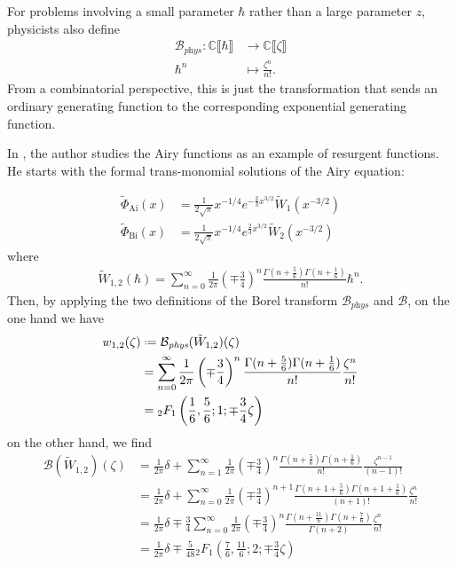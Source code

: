 \documentclass{article}
\newcommand{\maps}{\colon}
\newcommand{\C}{\mathbb{C}}
\newcommand*{\defeq}{\mathrel{\vcenter{\baselineskip0.5ex \lineskiplimit0pt
                     \hbox{\scriptsize.}\hbox{\scriptsize.}}}%
                     =}
\newcommand{\borel}{\mathcal{B}}
\theoremstyle{definition}
\theoremstyle{plain}
\begin{document}
For problems involving a small parameter $\hbar$ rather than a large parameter $z$, physicists also define
\begin{align*}
\borel_{\textit{phys}} \maps \C \llbracket \hbar \rrbracket & \to \C \llbracket \zeta \rrbracket \\
\hbar^n & \mapsto \frac{\zeta^n}{n!}.
\end{align*}
From a combinatorial perspective, this is just the transformation that sends an ordinary generating function to the corresponding exponential generating function.

In \cite{lectures-Marino}, the author studies the Airy functions as an example of resurgent functions. He starts with the formal trans-monomial solutions of the Airy equation:

\begin{align*}
\tilde{\Phi}_{\mathrm{Ai}}(x)&=\frac{1}{2\sqrt{\pi}}x^{-1/4}e^{-\tfrac{2}{3}x^{3/2}}\tilde{W}_1(x^{-3/2})\\
\tilde{\Phi}_{\mathrm{Bi}}(x)&=\frac{1}{2\sqrt{\pi}}x^{-1/4}e^{\tfrac{2}{3}x^{3/2}}\tilde{W}_2(x^{-3/2})
\end{align*}  
where 
\begin{align*}
\tilde{W}_{1,2}(\hbar)=\sum_{n=0}^{\infty}\frac{1}{2\pi}\left(\mp\frac{3}{4}\right)^{n}\frac{\Gamma(n+\frac{5}{6})\Gamma(n+\frac{1}{6})}{n!}\hbar^n.
\end{align*}
Then, by applying the two definitions of the Borel transform $\borel_{\textit{phys}}$ and $\borel$, on the one hand we have  
\begin{align*}
w_{1,2}(\zeta)&\defeq\borel_{\textit{phys}}(\tilde{W}_{1,2})(\zeta)\\
&=\sum_{n=0}^{\infty}\frac{1}{2\pi}\left(\mp\frac{3}{4}\right)^{n}\frac{\Gamma(n+\frac{5}{6})\Gamma(n+\frac{1}{6})}{n!}\frac{\zeta^n}{n!}\\
&={}_2F_1\left(\frac{1}{6},\frac{5}{6};1;\mp\frac{3}{4}\zeta\right) 
\end{align*}
on the other hand, we find
\begin{align*}
\borel(\tilde{W}_{1,2})(\zeta)&=\frac{1}{2\pi}\delta+\sum_{n=1}^{\infty} \frac{1}{2\pi}\left(\mp\frac{3}{4}\right)^{n}\frac{\Gamma(n+\frac{5}{6})\Gamma(n+\frac{1}{6})}{n!}\frac{\zeta^{n-1}}{(n-1)!}\\
&=\frac{1}{2\pi}\delta+\sum_{n=0}^{\infty} \frac{1}{2\pi}\left(\mp\frac{3}{4}\right)^{n+1}\frac{\Gamma(n+1+\frac{5}{6})\Gamma(n+1+\frac{1}{6})}{(n+1)!}\frac{\zeta^{n}}{n!}\\
&=\frac{1}{2\pi}\delta\mp\frac{3}{4}\sum_{n=0}^{\infty} \frac{1}{2\pi}\left(\mp\frac{3}{4}\right)^{n}\frac{\Gamma(n+\frac{11}{6})\Gamma(n+\frac{7}{6})}{\Gamma(n+2)}\frac{\zeta^{n}}{n!}\\
&=\frac{1}{2\pi}\delta\mp\frac{5}{48} {}_2F_1\left(\frac{7}{6},\frac{11}{6};2;\mp\frac{3}{4}\zeta\right)%
\end{align*}
\end{document}
